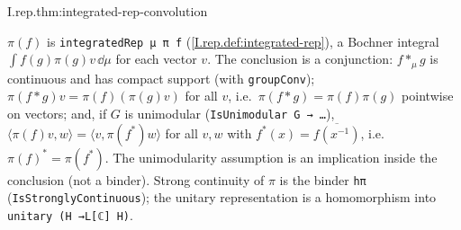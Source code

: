 \begin{tfformal}{I.rep.thm:integrated-rep-convolution}
\begin{tffidelity}
$\pi(f)$ is \texttt{integratedRep μ π f} (\cref{I.rep.def:integrated-rep}), a Bochner integral $\int f(g)\pi(g)v\,\dd\mu$ for each vector $v$. The conclusion is a conjunction: $f*_\mu g$ is continuous and has compact support (with \texttt{groupConv}); $\pi(f*g)v=\pi(f)(\pi(g)v)$ for all $v$, i.e.\ $\pi(f*g)=\pi(f)\pi(g)$ pointwise on vectors; and, if $G$ is unimodular (\texttt{IsUnimodular G → …}), $\langle\pi(f)v,w\rangle=\langle v,\pi(f^*)w\rangle$ for all $v,w$ with $f^*(x)=\overline{f(x^{-1})}$, i.e.\ $\pi(f)^*=\pi(f^*)$. The unimodularity assumption is an implication inside the conclusion (not a binder). Strong continuity of $\pi$ is the binder \texttt{hπ} (\texttt{IsStronglyContinuous}); the unitary representation is a homomorphism into \texttt{unitary (H →L[ℂ] H)}.
\end{tffidelity}
\end{tfformal}
